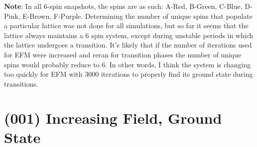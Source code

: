 \documentclass{article}
\begin{document}
    \textbf{Note}: In all 6-spin snapshots, the spins are as such: A-Red, B-Green, C-Blue, D-Pink, E-Brown, F-Purple.
    Determining the number of unique spins that populate a particular lattice was not done for all simulations, but so
    far it seems that the lattice always maintains a 6 spin system, except during unstable periods in which the lattice
    undergoes a transition. It's likely that if the number of iterations used for EFM were increased and reran for
    transition phases the number of unique spins would probably reduce to 6. In other words, I think the system is changing too 
    quickly for EFM with 3000 iterations to properly find its ground state during transitions.
\clearpage
\section{(001) Increasing Field, Ground State}
\end{document}
